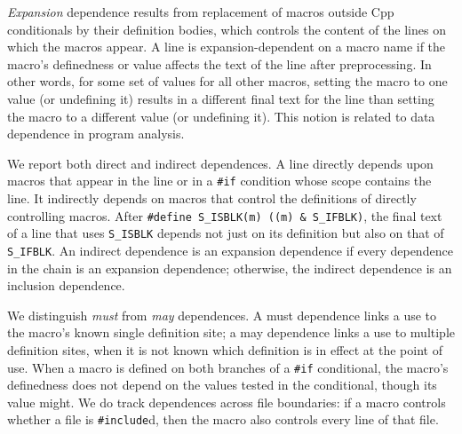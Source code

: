 \documentclass[10pt]{article}
\begin{document}
\emph{Expansion} dependence results from replacement of macros outside Cpp
conditionals by their definition bodies, which controls the content of the
lines on which the macros appear.  A line is expansion-dependent on a macro
name if the macro's definedness or value affects the text of the line after
preprocessing.  In other words, for some set of values for all other
macros, setting the macro to one value (or undefining it) results in a
different final text for the line than setting the macro to a different
value (or undefining it).  This notion is related to data dependence in
program analysis.

We report both direct and indirect dependences.  A line directly depends
upon macros that appear in the line or in a {\tt \#if} condition whose
scope contains the line.  It indirectly depends on macros that control the
definitions of directly controlling macros.  After {\tt \#define
\verb|S_ISBLK|(m) ((m)~\&~\verb|S_IFBLK|)}, the final text of a line that
uses \verb|S_ISBLK| depends not just on its definition but also on that of
\verb|S_IFBLK|.  An indirect dependence is an expansion dependence if every
dependence in the chain is an expansion dependence; otherwise, the indirect
dependence is an inclusion dependence.

We distinguish \emph{must} from \emph{may} dependences.  A must dependence
links a use to the macro's known single definition site; a may dependence
links a use to multiple definition sites, when it is not known which
definition is in effect at the point of use.  When a macro is defined on
both branches of a {\tt \#if} conditional, the macro's definedness does not
depend on the values tested in the conditional, though its value might.  We
do track dependences across file boundaries: if a macro controls whether a
file is {\tt \#include}d, then the macro also controls every line of that
file.

\end{document}
